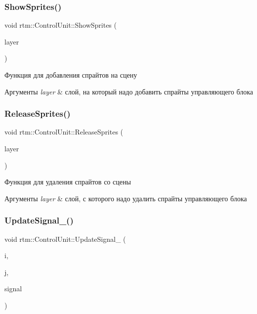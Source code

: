\subsubsection{\texorpdfstring{Show\+Sprites()}{ShowSprites()}}
{\footnotesize\ttfamily void rtm\+::\+Control\+Unit\+::\+Show\+Sprites (\begin{DoxyParamCaption}\item[{cocos2d\+::\+Layer $\ast$const}]{layer }\end{DoxyParamCaption})}

Функция для добавления спрайтов на сцену 
\begin{DoxyParams}{Аргументы}
{\em layer} & слой, на который надо добавить спрайты управляющего блока \\
\hline
\end{DoxyParams}
\mbox{\label{classrtm_1_1_control_unit_ac21d7c91d9c62fb58f29b2412ce4d4be}} 
\subsubsection{\texorpdfstring{Release\+Sprites()}{ReleaseSprites()}}
{\footnotesize\ttfamily void rtm\+::\+Control\+Unit\+::\+Release\+Sprites (\begin{DoxyParamCaption}\item[{cocos2d\+::\+Layer $\ast$const}]{layer }\end{DoxyParamCaption})}

Функция для удаления спрайтов со сцены 
\begin{DoxyParams}{Аргументы}
{\em layer} & слой, с которого надо удалить спрайты управляющего блока \\
\hline
\end{DoxyParams}
\mbox{\label{classrtm_1_1_control_unit_afacb521a6f7297b932a48edbbf0a10b2}} 
\subsubsection{\texorpdfstring{Update\+Signal\+\_\+()}{UpdateSignal\_()}}
{\footnotesize\ttfamily void rtm\+::\+Control\+Unit\+::\+Update\+Signal\+\_\+ (\begin{DoxyParamCaption}\item[{size\+\_\+t}]{i,  }\item[{size\+\_\+t}]{j,  }\item[{\hyperlink{namespacertm_aadb7300c15d57429546fb0b7f8ee0ee6}{Signal\+Type}}]{signal }\end{DoxyParamCaption})\hspace{0.3cm}{\ttfamily [private]}}

